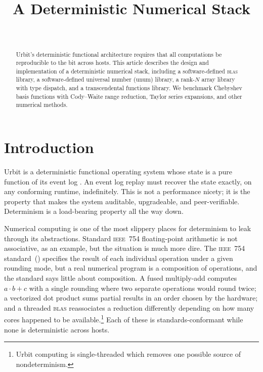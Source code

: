 \documentclass[twoside]{article}
\title{A Deterministic Numerical Stack}
\author{\authorname~\authorpatp \\ \affiliation}
\date{}
\begin{document}
\maketitle
\thispagestyle{firststyle}

\begin{abstract}
Urbit's deterministic functional architecture requires that all computations be reproducible to the bit across hosts.  This article describes the design and implementation of a deterministic numerical stack, including a software-defined \textsc{blas} library, a software-defined universal number (unum) library, a rank-$N$ array library with type dispatch, and a transcendental functions library.  We benchmark Chebyshev basis functions with Cody--Waite range reduction, Taylor series expansions, and other numerical methods.
\end{abstract}

\setcounter{page}{59}

\tableofcontents

\section{Introduction}

Urbit is a deterministic functional operating system whose state is a pure function of its event log \citep{Whitepaper}.  An event log replay must recover the state exactly, on any conforming runtime, indefinitely.  This is not a performance nicety; it is the property that makes the system auditable, upgradeable, and peer-verifiable.  Determinism is a load-bearing property all the way down.

Numerical computing is one of the most slippery places for determinism to leak through its abstractions.  Standard \textsc{ieee}~754 floating-point arithmetic is not associative, as an example, but the situation is much more dire.  The \textsc{ieee}~754 standard~(\citeyear{ieee754-2019}) specifies the result of each individual operation under a given rounding mode, but a real numerical program is a composition of operations, and the standard says little about composition.  A fused multiply-add computes $a\cdot b + c$ with a single rounding where two separate operations would round twice; a vectorized dot product sums partial results in an order chosen by the hardware; and a threaded \textsc{blas} reassociates a reduction differently depending on how many cores happened to be available.\footnote{Urbit computing is single-threaded which removes one possible source of nondeterminism.}  Each of these is standards-conformant while none is deterministic across hosts.
\end{document}
